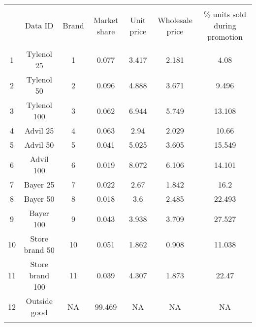 
\begin{table}[!htbp] \centering 
  \caption{} 
  \label{} 
\begin{tabular}{@{\extracolsep{5pt}} ccccccc} 
\\[-1.8ex]\hline 
\hline \\[-1.8ex] 
 & Data ID & Brand & Market share & Unit price & Wholesale price & \% units sold during promotion \\ 
\hline \\[-1.8ex] 
1 & Tylenol 25 & 1 & 0.077 & 3.417 & 2.181 & 4.08 \\ 
2 & Tylenol 50 & 2 & 0.096 & 4.888 & 3.671 & 9.496 \\ 
3 & Tylenol 100 & 3 & 0.062 & 6.944 & 5.749 & 13.108 \\ 
4 & Advil 25 & 4 & 0.063 & 2.94 & 2.029 & 10.66 \\ 
5 & Advil 50 & 5 & 0.041 & 5.025 & 3.605 & 15.549 \\ 
6 & Advil 100 & 6 & 0.019 & 8.072 & 6.106 & 14.101 \\ 
7 & Bayer 25 & 7 & 0.022 & 2.67 & 1.842 & 16.2 \\ 
8 & Bayer 50 & 8 & 0.018 & 3.6 & 2.485 & 22.493 \\ 
9 & Bayer 100 & 9 & 0.043 & 3.938 & 3.709 & 27.527 \\ 
10 & Store brand 50 & 10 & 0.051 & 1.862 & 0.908 & 11.038 \\ 
11 & Store brand 100 & 11 & 0.039 & 4.307 & 1.873 & 22.47 \\ 
12 & Outside good & NA & 99.469 & NA & NA & NA \\ 
\hline \\[-1.8ex] 
\end{tabular} 
\end{table} 
